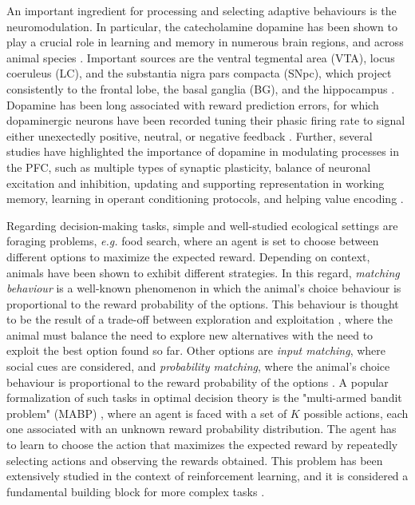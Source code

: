An important ingredient for processing and selecting adaptive behaviours is the neuromodulation. In particular, the catecholamine dopamine has been shown to play a crucial role in learning and memory in numerous brain regions, and across animal species \cite{puigDopamineModulationLearning2014, duszkiewiczNoveltyDopaminergicModulation2019}.
Important sources are the ventral tegmental area (VTA), locus coeruleus (LC), and the substantia nigra pars compacta (SNpc), which project consistently to the frontal lobe, the basal ganglia (BG), and the hippocampus \cite{gotoPrefrontalCorticalSynaptic2007, coolsChemistryAdaptiveMind2019, reynoldsDopaminedependentPlasticityCorticostriatal2002}.
Dopamine has been long associated with reward prediction errors, for which dopaminergic neurons have been recorded tuning their phasic firing rate to signal either unexectedly positive, neutral, or negative feedback \cite{toblerAdaptiveCodingReward2005, schultzNeuralSubstratePrediction1997}.
Further, several studies have highlighted the importance of dopamine in modulating processes in the PFC, such as multiple types of synaptic plasticity, balance of neuronal excitation and inhibition, updating and supporting representation in working memory, learning in operant conditioning protocols,
and helping value encoding \cite{sheynikhovichLongtermMemorySynaptic2023, didomenicoDopaminergicModulationPrefrontal2023, lohaniDopamineModulationPrefrontal2019, dardenneRolePrefrontalCortex2012,
roeschDopamineNeuronsEncode2007}.

Regarding decision-making tasks, simple and well-studied ecological settings are foraging problems, \textit{e.g.} food search, where an agent is set to choose between different options to maximize the expected reward.
Depending on context, animals have been shown to exhibit different strategies.
In this regard, \textit{matching behaviour} is a well-known phenomenon in which the animal's choice behaviour is proportional to the reward probability of the options.
This behaviour is thought to be the result of a trade-off between exploration and exploitation \cite{suttonReinforcementLearningProblem1998, nivEvolutionReinforcementLearning2002}, where the animal must balance the need to explore new alternatives with the need to exploit the best option found so far.
Other options are \textit{input matching}, where social cues are considered, and \textit{probability matching}, where the animal's choice behaviour is proportional to the reward probability of the options
\cite{bariDynamicDecisionMaking2021, houstonMatchingBehavioursRewards2021}. A popular formalization of such tasks in optimal decision theory is the "multi-armed bandit problem" (MABP) \cite{averbeckTheoryChoiceBandit2015}, where an agent is faced with a set of $K$ possible actions, each one associated with an unknown reward probability distribution.
The agent has to learn to choose the action that maximizes the expected reward by repeatedly selecting actions and observing the rewards obtained.
This problem has been extensively studied in the context of reinforcement learning, and it is considered a fundamental building block for more complex tasks \cite{suttonReinforcementLearningProblem1998}.


